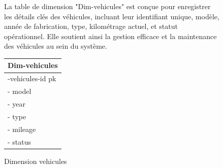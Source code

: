 \begin{figure}[htbp]
    \centering
    \begin{minipage}{0.60\textwidth}


        La table de dimension "Dim-vehicules" est conçue pour enregistrer les détails clés des véhicules, incluant leur identifiant unique, modèle, année de fabrication, type, kilométrage actuel, et statut opérationnel. Elle soutient ainsi la gestion efficace et la maintenance des véhicules au sein du système.

    \end{minipage}
    \hfill
    \begin{minipage}{0.38\textwidth}

        \renewcommand{\arraystretch}{1.7}
        \centering
        \begin{tabular}{|p{4cm}|}
            \hline
            \textbf{Dim-vehicules} \\
            \hline
            -vehicules-id     pk   \\

            - model                \\

            - year                 \\

            - type                 \\

            - mileage              \\

            - status               \\

            \hline
        \end{tabular}

        \caption{Dimension vehicules}

    \end{minipage}
\end{figure}

